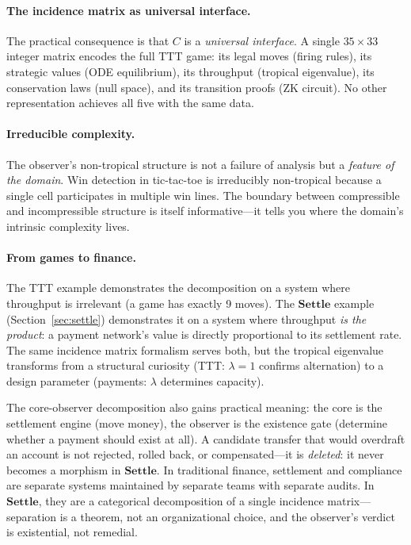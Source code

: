\documentclass[11pt,a4paper]{article}
\newcommand{\Settle}{\mathbf{Settle}}
\begin{document}
\paragraph{The incidence matrix as universal interface.}
The practical consequence is that $C$ is a \emph{universal interface}.
A single $35 \times 33$ integer matrix encodes the full TTT game: its legal moves (firing rules), its strategic values (ODE equilibrium), its throughput (tropical eigenvalue), its conservation laws (null space), and its transition proofs (ZK circuit).
No other representation achieves all five with the same data.

\paragraph{Irreducible complexity.}
The observer's non-tropical structure is not a failure of analysis but a \emph{feature of the domain}.
Win detection in tic-tac-toe is irreducibly non-tropical because a single cell participates in multiple win lines.
The boundary between compressible and incompressible structure is itself informative---it tells you where the domain's intrinsic complexity lives.

\paragraph{From games to finance.}
The TTT example demonstrates the decomposition on a system where throughput is irrelevant (a game has exactly 9 moves).
The $\Settle$ example (Section~\ref{sec:settle}) demonstrates it on a system where throughput \emph{is the product}: a payment network's value is directly proportional to its settlement rate.
The same incidence matrix formalism serves both, but the tropical eigenvalue transforms from a structural curiosity (TTT: $\lambda = 1$ confirms alternation) to a design parameter (payments: $\lambda$ determines capacity).

The core-observer decomposition also gains practical meaning: the core is the settlement engine (move money), the observer is the existence gate (determine whether a payment should exist at all).
A candidate transfer that would overdraft an account is not rejected, rolled back, or compensated---it is \emph{deleted}: it never becomes a morphism in $\Settle$.
In traditional finance, settlement and compliance are separate systems maintained by separate teams with separate audits.
In $\Settle$, they are a categorical decomposition of a single incidence matrix---separation is a theorem, not an organizational choice, and the observer's verdict is existential, not remedial.
\end{document}
